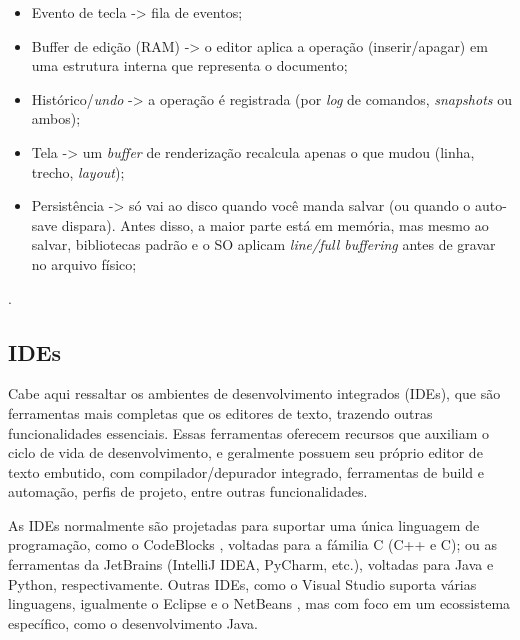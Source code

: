 \begin{itemize}
    \item Evento de tecla -> fila de eventos;

    \item Buffer de edição (RAM) -> o editor aplica a operação (inserir/apagar)
        em uma estrutura interna que representa o documento;

    \item Histórico/\textit{undo} -> a operação é registrada (por \textit{log} de
        comandos, \textit{snapshots} ou ambos);

    \item Tela -> um \textit{buffer} de renderização recalcula apenas o que mudou
        (linha, trecho, \textit{layout});

    \item Persistência -> só vai ao disco quando você manda salvar (ou quando o auto-save
        dispara). Antes disso, a maior parte está em memória, mas mesmo ao salvar,
        bibliotecas padrão e o SO aplicam \textit{line/full buffering} antes de gravar
        no arquivo físico;
\end{itemize}
\cite{glibc-buffering-concepts}.

\subsection{IDEs}

Cabe aqui ressaltar os ambientes de desenvolvimento integrados (IDEs), que são ferramentas
mais completas que os editores de texto, trazendo outras funcionalidades
essenciais. Essas ferramentas oferecem recursos que auxiliam o ciclo de vida de desenvolvimento,
e geralmente possuem seu próprio editor de texto embutido, com compilador/depurador
integrado, ferramentas de build e automação, perfis de projeto, entre outras
funcionalidades.

As IDEs normalmente são projetadas para suportar uma única linguagem de
programação, como o CodeBlocks \cite{codeblocks}, voltadas para a fámilia C (C++
e C); ou as ferramentas da JetBrains \cite{jetbrains_tools} (IntelliJ IDEA, PyCharm,
etc.), voltadas para Java e Python, respectivamente. Outras IDEs, como o Visual
Studio \cite{visual_studio} suporta várias linguagens, igualmente o Eclipse \cite{eclipse_ide}
e o NetBeans \cite{netbeans_ide}, mas com foco em um ecossistema específico, como
o desenvolvimento Java.

